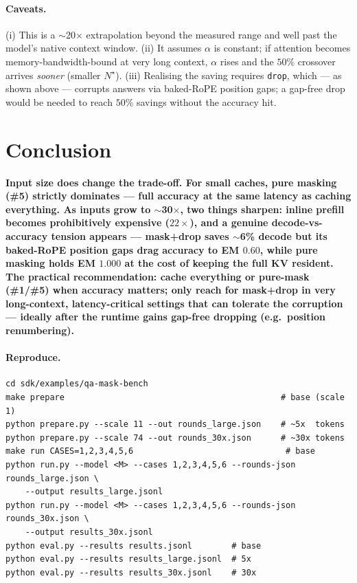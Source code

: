 \documentclass[11pt]{article}
\begin{document}
\paragraph{Caveats.} (i) This is a $\sim$20$\times$ extrapolation beyond the
measured range and well past the model's native context window. (ii) It assumes
$\alpha$ is constant; if attention becomes memory-bandwidth-bound at very long
context, $\alpha$ rises and the $50\%$ crossover arrives \emph{sooner} (smaller
$N^\star$). (iii) Realising the saving requires \texttt{drop}, which --- as shown
above --- corrupts answers via baked-RoPE position gaps; a gap-free drop would be
needed to reach $50\%$ savings without the accuracy hit.

\section*{Conclusion}
\textbf{Input size does change the trade-off. For small caches, pure masking
(\#5) strictly dominates --- full accuracy at the same latency as caching
everything. As inputs grow to $\sim$30$\times$, two things sharpen: inline prefill
becomes prohibitively expensive ($22\times$), and a genuine decode-vs-accuracy
tension appears --- mask+drop saves $\sim$6\% decode but its baked-RoPE position
gaps drag accuracy to EM $0.60$, while pure masking holds EM $1.000$ at the cost
of keeping the full KV resident. The practical recommendation: cache everything
or pure-mask (\#1/\#5) when accuracy matters; only reach for mask+drop in very
long-context, latency-critical settings that can tolerate the corruption ---
ideally after the runtime gains gap-free dropping (e.g.\ position renumbering).}

\paragraph{Reproduce.}
\begin{lstlisting}
cd sdk/examples/qa-mask-bench
make prepare                                            # base (scale 1)
python prepare.py --scale 11 --out rounds_large.json    # ~5x  tokens
python prepare.py --scale 74 --out rounds_30x.json      # ~30x tokens
make run CASES=1,2,3,4,5,6                               # base
python run.py --model <M> --cases 1,2,3,4,5,6 --rounds-json rounds_large.json \
    --output results_large.jsonl
python run.py --model <M> --cases 1,2,3,4,5,6 --rounds-json rounds_30x.json \
    --output results_30x.jsonl
python eval.py --results results.jsonl        # base
python eval.py --results results_large.jsonl  # 5x
python eval.py --results results_30x.jsonl    # 30x
\end{lstlisting}
\end{document}
